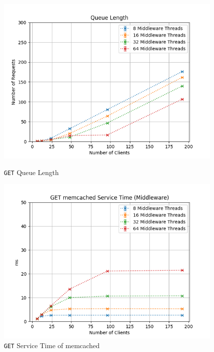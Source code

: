 \documentclass[11pt,a4paper]{article}
\begin{document}
\begin{figure}[H]
	\centering
    \begin{minipage}{0.5\textwidth}
        \includegraphics[width=\textwidth]{../illustrations/plots/2_1_one_middleware/0-1/middleware_queue_length.png}
        \caption{\texttt{GET} Queue Length}
        \label{fig:one_middleware_get_ql}
    \end{minipage}\hfill
    \begin{minipage}{0.5\textwidth}
        \centering
        \includegraphics[width=\textwidth]{../illustrations/plots/2_1_one_middleware/0-1/middleware_get_service_time_ms.png}
        \caption{\texttt{GET} Service Time of memcached}
        \label{fig:one_middleware_get_st_mw}
    \end{minipage}
\end{figure}
\end{document}
